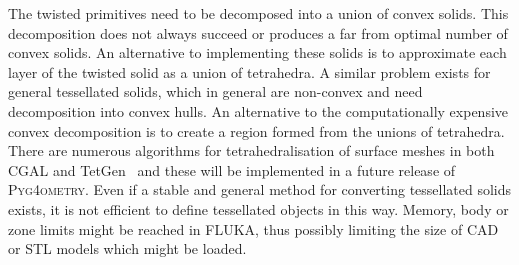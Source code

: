 \documentclass[final,5p,times,twocolumn]{elsarticle}
\newcommand{\PYGEOMETRY}{\textsc{Pyg4ometry}}
\begin{document}
The twisted primitives need to be decomposed
into a union of convex solids. This decomposition does not always
succeed or produces a far from optimal number of convex solids.
An alternative to implementing these solids is to approximate each
layer of the twisted solid as a union of tetrahedra. A similar problem
exists for general tessellated solids, which in general
are non-convex and need decomposition into convex hulls. An alternative
to the computationally expensive convex decomposition is to
create a region formed from the unions of tetrahedra. There are numerous
algorithms for tetrahedralisation of surface meshes in both CGAL and TetGen~\cite{tetgen}
and these will be implemented in a future release of \PYGEOMETRY{}. Even if a stable and general
method for converting tessellated solids exists, it is not efficient to define
tessellated objects in this way.  Memory, body or zone limits might
be reached in FLUKA, thus possibly limiting the size of CAD or STL models which
might be loaded.
\end{document}
